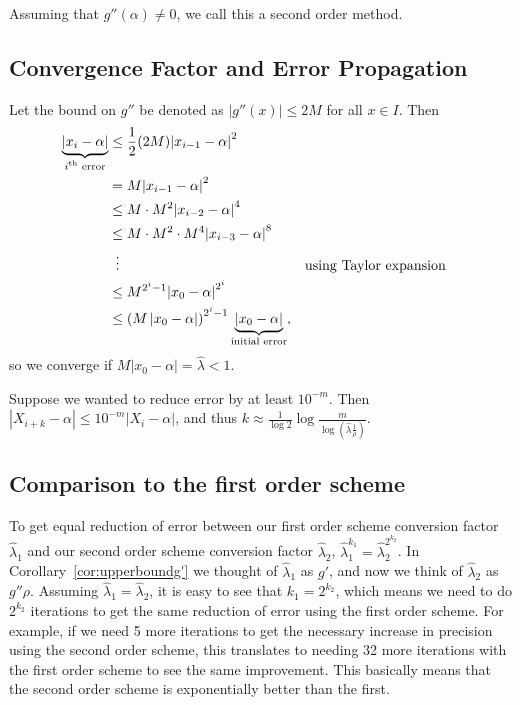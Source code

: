 \documentclass[12pt,letterpaper,DIV=11]{scrartcl}
\theoremstyle{plain}
\theoremstyle{definition}
\theoremstyle{remark}
\begin{document}
Assuming that $g''(\alpha) \neq 0$, we call this a second order method.

\subsection{Convergence Factor and Error Propagation}
Let the bound on $g''$ be denoted as $|g''(x)| \leq 2M$ for all $x \in I$.
Then \begin{align*}
  \underbrace{|x_i - \alpha|}_\text{$i$\textsuperscript{th} error} &\leq \frac{1}{2} (2M) {\left\lvert x_{i - 1} - \alpha \right\rvert}^2 \\
                                                                   &= M {\left\lvert x_{i - 1} - \alpha \right\rvert}^2 \\
                                                                   &\leq M \cdot M^2 {\left\lvert x_{i - 2} - \alpha \right\rvert}^4 \\
                                                                   &\leq M \cdot M^2 \cdot M^4 {\left\lvert x_{i - 3} - \alpha \right\rvert}^8 \\
                                                                   &\vdotswithin{\leq} && \text{using Taylor expansion} \\
                                                                   &\leq M^{2^i - 1} {\left\lvert x_0 - \alpha \right\rvert}^{2^i} \\
                                                                   &\leq {(M \left\lvert x_0 - \alpha \right\rvert)}^{2^i - 1} \underbrace{\left\lvert x_0 - \alpha \right\rvert}_\text{initial error},
\end{align*}
so we converge if $M |x_0 - \alpha| = \hat{\lambda} < 1$.

Suppose we wanted to reduce error by at least $10^{-m}$.
Then $|X_{i + k} - \alpha| \leq 10^{-m} |X_i - \alpha|$, and thus $k \approx \frac{1}{\log 2} \log \frac{m}{\log \left( \hat{\lambda} \frac{1}{\rho} \right)}$.

\subsection{Comparison to the first order scheme}
To get equal reduction of error between our first order scheme conversion factor $\hat{\lambda}_1$ and our second order scheme conversion factor $\hat{\lambda}_2$, $\hat{\lambda}_1^{k_1} = \hat{\lambda}_2^{2^{k_2}}$.
In Corollary~\ref{cor:upperboundg'} we thought of $\hat{\lambda}_1$ as $g'$, and now we think of $\hat{\lambda}_2$ as $g'' \rho$.
Assuming $\hat{\lambda}_1 = \hat{\lambda}_2$, it is easy to see that $k_1 = 2^{k_2}$, which means we need to do $2^{k_2}$ iterations to get the same reduction of error using the first order scheme.
For example, if we need 5 more iterations to get the necessary increase in precision using the second order scheme, this translates to needing 32 more iterations with the first order scheme to see the same improvement.
This basically means that the second order scheme is exponentially better than the first.
\end{document}
